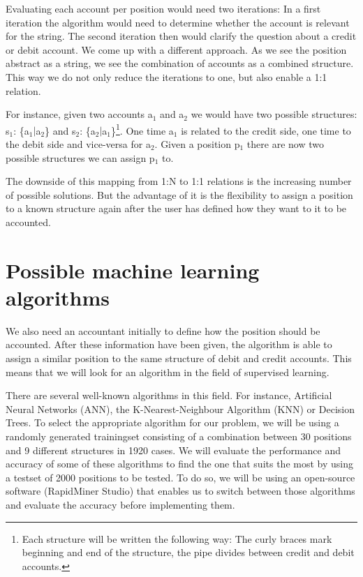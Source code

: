 Evaluating each account per position would need two iterations: In a first iteration the algorithm would need to determine whether the account is relevant for the string. The second iteration then would clarify the question about a credit or debit account.%
We come up with a different approach. As we see the position abstract as a string, we see the combination of accounts as a combined structure. This way we do not only reduce the iterations to one, but also enable a 1:1 relation.

For instance, given two accounts a$_1$ and a$_2$ we would have two possible structures: s$_1$: \{a$_1$$|$a$_2$\} and s$_2$: \{a$_2$$|$a$_1$\}\footnote{Each structure will be written the following way: The curly braces mark beginning and end of the structure, the pipe divides between credit and debit accounts.}. One time a$_1$ is related to the credit side, one time to the debit side and vice-versa for a$_2$. Given a position p$_1$ there are now two possible structures we can assign p$_1$ to.

The downside of this mapping from 1:N to 1:1 relations is the increasing number of possible solutions. But the advantage of it is the flexibility to assign a position to a known structure again after the user has defined how they want to it to be accounted.

\section{Possible machine learning algorithms}
\label{sec4.2}
We also need an accountant initially to define how the position should be accounted. After these information have been given, the algorithm is able to assign a similar position to the same structure of debit and credit accounts. This means that we will look for an algorithm in the field of supervised learning.

There are several well-known algorithms in this field. For instance, Artificial Neural Networks (ANN), the K-Nearest-Neighbour Algorithm (KNN) or Decision Trees. To select the appropriate algorithm for our problem, we will be using a randomly generated trainingset consisting of a combination between 30 positions and 9 different structures in 1920 cases. We will evaluate the performance and accuracy of some of these algorithms to find the one that suits the most by using a testset of 2000 positions to be tested. To do so, we will be using an open-source software (RapidMiner Studio) that enables us to switch between those algorithms and evaluate the accuracy before implementing them.

